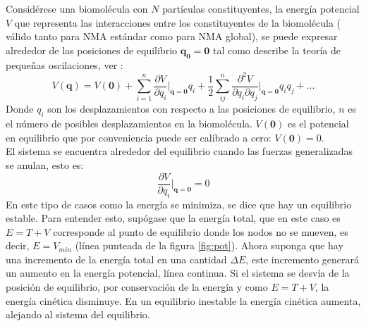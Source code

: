 Consid\'{e}rese una biomol\'{e}cula con $N$ part\'{i}culas constituyentes, la energ\'{i}a potencial $V$ que representa las interacciones entre los constituyentes de la biomol\'{e}cula ( v\'{a}lido tanto para NMA est\'{a}ndar como para NMA global), se puede expresar alrededor de las posiciones de equilibrio $\mathbf{q_0}=\mathbf{0}$ tal como describe la teor\'{i}a de peque\~{n}as oscilaciones, ver \cite{Goldstein2001}:
\begin{equation}\label{eq:1}
V(\mathbf{q})=V(\mathbf{0})+\sum_{i=1}^n\frac{\partial V}{\partial q_i}\bigg|_{\mathbf{q}=\mathbf{0}}q_i+\frac{1}{2}\sum_{ij}^{n}\frac{\partial^2 V }{\partial q_i\partial q_j}\bigg|_{\mathbf{q}=\mathbf{0}}q_i q_j+...
\end{equation}
Donde $q_i$ son los desplazamientos con respecto a las posiciones de equilibrio, $n$ es el n\'{u}mero de posibles desplazamientos en la biomol\'{e}cula. $V(\mathbf{0})$ es el potencial en equilibrio que por conveniencia puede ser calibrado a cero: $V(\mathbf{0})=0$. \\


El sistema se encuentra alrededor del equilibrio cuando las fuerzas generalizadas se anulan, esto es:
\begin{equation}\label{eq:2}
\frac{\partial V}{\partial q_i}\bigg|_{\mathbf{q}=\mathbf{0}}=0
\end{equation}
En este tipo de casos como la energ\'{i}a se minimiza, se dice que hay un equilibrio estable. Para entender esto, sup\'{o}gase que la energ\'{i}a total, que en este caso es $E=T+V$ corresponde al punto de equilibrio donde los nodos no se mueven, es decir, $E=V_{min}$ (l\'{i}nea punteada de la figura \ref{fig:pot}). Ahora suponga que hay una incremento de la energ\'{i}a total en una cantidad $\Delta E$, este incremento generar\'{a} un aumento en la energ\'{i}a potencial, l\'{i}nea continua.  Si el sistema se desv\'{i}a de la posici\'{o}n de equilibrio, por conservaci\'{o}n de la energ\'{i}a y como $E=T+V$, la energ\'{i}a cin\'{e}tica disminuye. En un equilibrio inestable la energ\'{i}a cin\'{e}tica aumenta, alejando al sistema del equilibrio. \cite{Goldstein2001} \\

